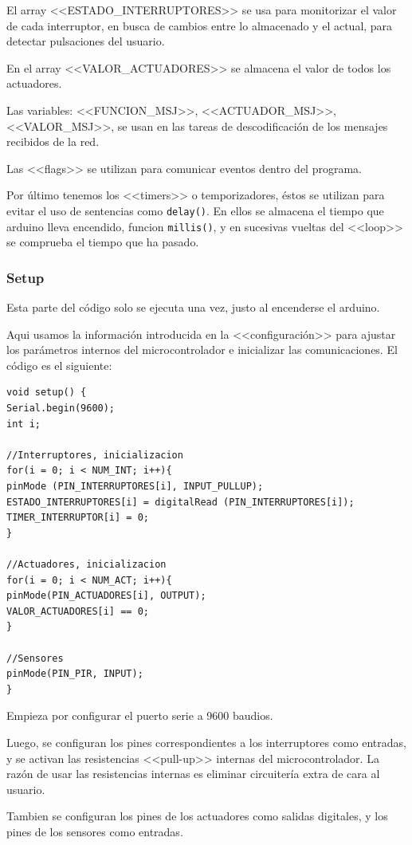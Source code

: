 El array <<ESTADO\_INTERRUPTORES>> se usa para monitorizar el valor de cada interruptor, en busca de cambios entre lo almacenado y el actual, para detectar pulsaciones del usuario.

En el array <<VALOR\_ACTUADORES>> se almacena el valor de todos los actuadores.

Las variables: <<FUNCION\_MSJ>>, <<ACTUADOR\_MSJ>>, <<VALOR\_MSJ>>, se usan en las tareas de descodificación de los mensajes recibidos de la red.

Las <<flags>> se utilizan para comunicar eventos dentro del programa.

Por último tenemos los <<timers>> o temporizadores, éstos se utilizan para evitar el uso de sentencias como \lstinline[]|delay()|. En ellos se almacena el tiempo que arduino lleva encendido, funcion \lstinline|millis()|, y en sucesivas vueltas del <<loop>> se comprueba el tiempo que ha pasado.


\subsubsection{Setup}
Esta parte del código solo se ejecuta una vez, justo al encenderse el arduino.

Aqui usamos la información introducida en la <<configuración>> para ajustar los parámetros internos del microcontrolador e inicializar las comunicaciones. El código es el siguiente:

\begin{lstlisting}
void setup() {
Serial.begin(9600);
int i;

//Interruptores, inicializacion
for(i = 0; i < NUM_INT; i++){
pinMode (PIN_INTERRUPTORES[i], INPUT_PULLUP);
ESTADO_INTERRUPTORES[i] = digitalRead (PIN_INTERRUPTORES[i]);
TIMER_INTERRUPTOR[i] = 0;
}

//Actuadores, inicializacion
for(i = 0; i < NUM_ACT; i++){
pinMode(PIN_ACTUADORES[i], OUTPUT);
VALOR_ACTUADORES[i] == 0;
}

//Sensores
pinMode(PIN_PIR, INPUT);
}
\end{lstlisting}

Empieza por configurar el puerto serie a 9600 baudios. 

Luego, se configuran los pines correspondientes a los interruptores como entradas, y se activan las resistencias <<pull-up>> internas del microcontrolador. La razón de usar las resistencias internas es eliminar circuitería extra de cara al usuario.

Tambien se configuran los pines de los actuadores como salidas digitales, y los pines de los sensores como entradas.

